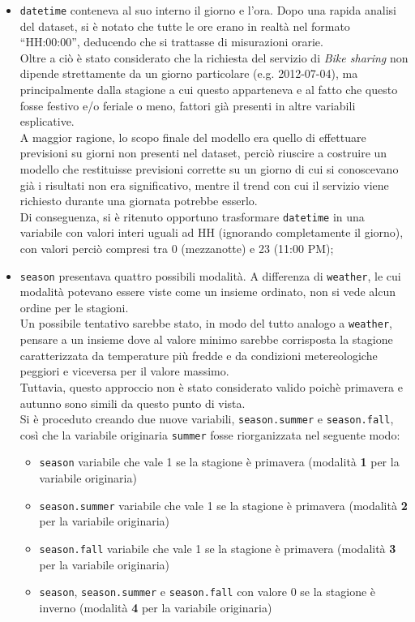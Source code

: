 \begin{itemize}
\item \texttt{datetime} conteneva al suo interno il giorno e l'ora.
  Dopo una rapida analisi del dataset, si è notato che tutte le ore erano in
  realtà nel formato ``HH:00:00'', deducendo che si trattasse di misurazioni
  orarie. \\
  Oltre a ciò è stato considerato che la richiesta del servizio di \emph{Bike
  sharing} non dipende strettamente da un giorno particolare (e.g. 2012-07-04),
  ma principalmente dalla stagione a cui questo apparteneva e al fatto che
  questo fosse festivo e/o feriale o meno, fattori già presenti in altre
  variabili esplicative. \\
  A maggior ragione, lo scopo finale del modello era quello di effettuare
  previsioni su giorni non presenti nel dataset, perciò riuscire a costruire
  un modello che restituisse previsioni corrette su un giorno di cui si
  conoscevano già i risultati non era significativo, mentre il trend con cui
  il servizio viene richiesto durante una giornata potrebbe esserlo. \\
  Di conseguenza, si è ritenuto opportuno trasformare \texttt{datetime} in una
  variabile con valori interi uguali ad HH (ignorando completamente il
  giorno), con valori perciò compresi tra 0 (mezzanotte) e 23 (11:00 PM);
\item \texttt{season} presentava quattro possibili modalità. A differenza di
  \texttt{weather}, le cui modalità potevano essere viste come un insieme
  ordinato, non si vede alcun ordine per le stagioni. \\
  Un possibile tentativo sarebbe stato, in modo del tutto analogo a
  \texttt{weather}, pensare a un insieme dove al valore minimo sarebbe
  corrisposta la stagione caratterizzata da temperature più fredde e da
  condizioni metereologiche peggiori e viceversa per il valore massimo. \\
  Tuttavia, questo approccio non è stato considerato valido poichè primavera e
  autunno sono simili da questo punto di vista. \\
  Si è proceduto creando due nuove variabili, \texttt{season.summer} e
  \texttt{season.fall}, così che la variabile originaria \texttt{summer} fosse
  riorganizzata nel seguente modo:
  \begin{itemize}
  \item \texttt{season} variabile che vale 1 se la stagione è primavera
    (modalità \textbf{1} per la variabile originaria)
  \item \texttt{season.summer} variabile che vale 1 se la stagione è primavera
    (modalità \textbf{2} per la variabile originaria)
  \item \texttt{season.fall} variabile che vale 1 se la stagione è primavera
    (modalità \textbf{3} per la variabile originaria)
  \item  \texttt{season}, \texttt{season.summer} e \texttt{season.fall} con
    valore 0 se la stagione è inverno (modalità \textbf{4} per la variabile
    originaria)
  \end{itemize}
\end{itemize}

